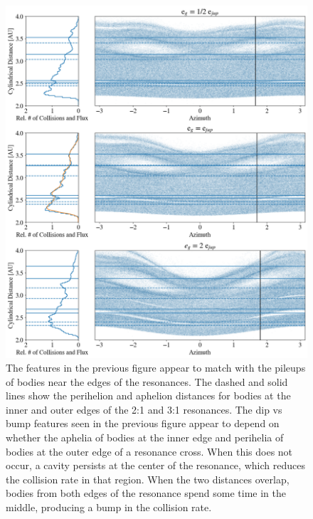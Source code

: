 \documentclass[onecolumn]{aastex63}
\begin{document}
\begin{figure}
    \includegraphics[width=\textwidth]{figures/coll_polar_e.png}
    \caption{The features in the previous figure appear to match with the pileups of bodies near the edges of the
    resonances. The dashed and solid lines show the perihelion and aphelion distances for bodies at the inner
    and outer edges of the 2:1 and 3:1 resonances. The dip vs bump features seen in the previous figure appear
    to depend on whether the aphelia of bodies at the inner edge and perihelia of bodies at the outer edge of a
    resonance cross. When this does not occur, a cavity persists at the center of the resonance, which reduces the
    collision rate in that region. When the two distances overlap, bodies from both edges of the resonance spend some
    time in the middle, producing a bump in the collision rate.\label{fig:coll_polar_e}}
\end{figure}
\end{document}
